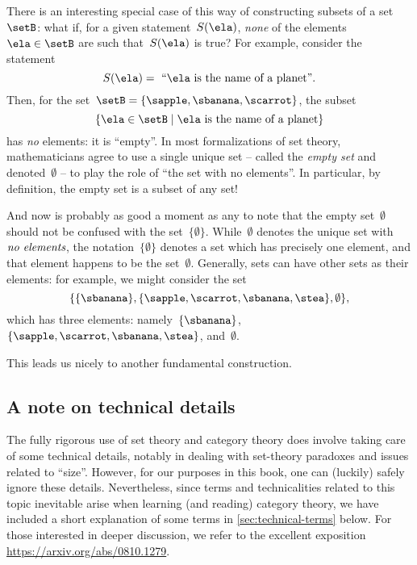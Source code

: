 There is an interesting special case of this way of constructing subsets of a set~$\setB$:
what if, for a given statement~$S(\ela)$, \emph{none} of the elements~$\ela \in \setB$ are such that~$S(\ela)$ is true?
For example, consider the statement
%
\begin{equation*}
    S(\ela) =\text{ ``} \ela \text{ is the name of a planet''}.
\end{equation*}
%
Then, for the set~$\setB = \{ \sapple, \sbanana, \scarrot \}$, the subset
\begin{equation*}
    \{ \ela \in \setB \mid \ela \text{ is the name of a planet} \}
\end{equation*}
has \emph{no} elements: it is ``empty''.
In most formalizations of set theory, mathematicians agree to use a single unique set -- called the \emph{empty set} and denoted~$\emptyset$ -- to play the role of ``the set with no elements''.
In particular, by definition, the empty set is a subset of any set!

And now is probably as good a moment as any to note that the empty set~$\emptyset$ should not be confused with the set~$\{ \emptyset \}$.
While~$\emptyset$ denotes the unique set with~$\emph{no elements}$, the notation~$\{ \emptyset \}$ denotes a set which has precisely one element, and that element happens to be the set~$\emptyset$.
Generally, sets can have other sets as their elements: for example, we might consider the set
%
\begin{equation*}
    \{ \{ \sbanana \}, \{ \sapple, \scarrot, \sbanana, \stea \}, \emptyset \},
\end{equation*}
%
which has three elements: namely~$\{ \sbanana \}$,~$\{ \sapple, \scarrot, \sbanana, \stea \}$, and~$\emptyset$.

This leads us nicely to another fundamental construction.


\subsection{A note on technical details}

The fully rigorous use of set theory and category theory does involve taking care of some technical details, notably in dealing with set-theory paradoxes and issues related to ``size''.
    However, for our purposes in this book, one can (luckily) safely ignore these details. 
    Nevertheless, since terms and technicalities related to this topic inevitable arise when learning (and reading) category theory, we have included a short explanation of some terms in \cref{sec:technical-terms} below.
    For those interested in deeper discussion, we refer to the excellent exposition \url{https://arxiv.org/abs/0810.1279}.




